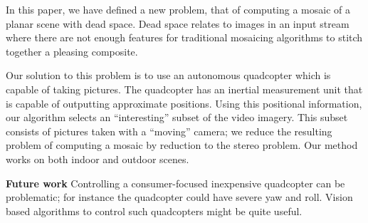 \documentclass[10pt,twocolumn,letterpaper]{article}
\begin{document}
In this paper, we have defined a new problem, that of computing a
mosaic of a planar scene with dead space.  Dead space relates to images
in an input stream where there are not enough features for traditional
mosaicing algorithms to stitch together a pleasing composite.  

Our solution to this problem is to use an autonomous quadcopter which
is capable of taking pictures.  The quadcopter has an inertial
measurement unit that is capable of outputting approximate
positions. Using this positional information, our algorithm selects an
``interesting'' subset of the video imagery.  This subset consists of
pictures taken with a ``moving'' camera; we reduce the resulting
problem of computing a mosaic by reduction to the stereo problem.  Our
method works on both indoor and outdoor scenes.

{\bf Future work} Controlling a consumer-focused inexpensive
quadcopter can be problematic; for instance the quadcopter could have
severe yaw and roll.  Vision based algorithms to control such
quadcopters might be quite useful.




\end{document}
